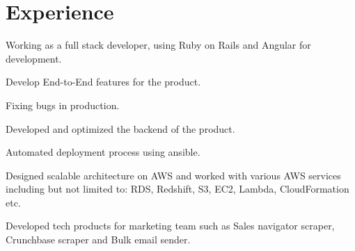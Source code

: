\documentclass[]{deedy-resume-reversed}
\begin{document}
%
%

%
%

%
%

\begin{minipage}[t]{0.60\textwidth}


\section{Experience}
\vspace{\topsep} %
\begin{tightemize}
\item Working as a full stack developer, using Ruby on Rails and Angular for development.
\item Develop End-to-End features for the product.
\item Fixing bugs in production.
\end{tightemize}
\sectionsep

\begin{tightemize}
\item Developed and optimized the backend of the product.
\item Automated deployment process using ansible.
\item Designed scalable architecture on AWS and worked with various AWS services including but not limited
to: RDS, Redshift, S3, EC2, Lambda, CloudFormation etc.
\item Developed tech products for marketing team such as Sales navigator scraper, Crunchbase scraper and Bulk email sender.
\end{tightemize}
\sectionsep


\end{minipage}
\end{document}
